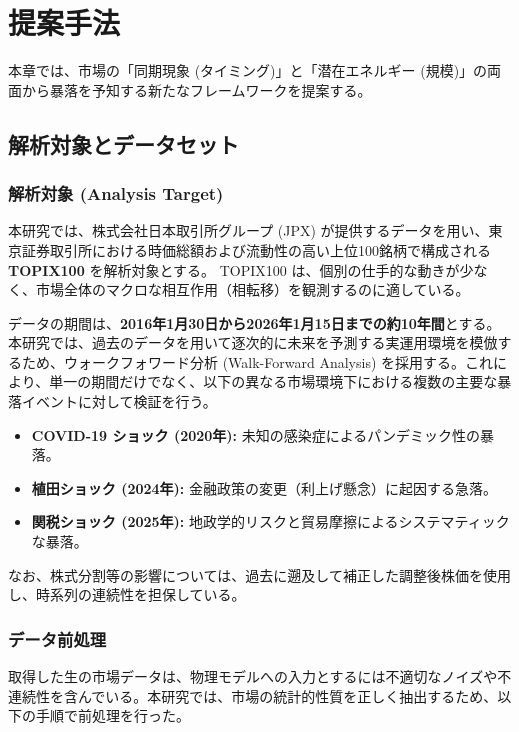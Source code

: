 \documentclass[11pt,a4paper,oneside]{ltjsarticle}
\begin{document}
\clearpage
\section{提案手法}
本章では、市場の「同期現象 (タイミング)」と「潜在エネルギー (規模)」の両面から暴落を予知する新たなフレームワークを提案する。

\subsection{解析対象とデータセット}
\subsubsection{解析対象 (Analysis Target)}
本研究では、株式会社日本取引所グループ (JPX) が提供するデータを用い、東京証券取引所における時価総額および流動性の高い上位100銘柄で構成される \textbf{TOPIX100} を解析対象とする。
TOPIX100 は、個別の仕手的な動きが少なく、市場全体のマクロな相互作用（相転移）を観測するのに適している。

データの期間は、\textbf{2016年1月30日から2026年1月15日までの約10年間}とする。
本研究では、過去のデータを用いて逐次的に未来を予測する実運用環境を模倣するため、ウォークフォワード分析 (Walk-Forward Analysis) を採用する。これにより、単一の期間だけでなく、以下の異なる市場環境下における複数の主要な暴落イベントに対して検証を行う。

\begin{itemize}
    \item \textbf{COVID-19 ショック (2020年):} 未知の感染症によるパンデミック性の暴落。
    \item \textbf{植田ショック (2024年):} 金融政策の変更（利上げ懸念）に起因する急落。
    \item \textbf{関税ショック (2025年):} 地政学的リスクと貿易摩擦によるシステマティックな暴落。
\end{itemize}

なお、株式分割等の影響については、過去に遡及して補正した調整後株価を使用し、時系列の連続性を担保している。

\subsubsection{データ前処理}
取得した生の市場データは、物理モデルへの入力とするには不適切なノイズや不連続性を含んでいる。本研究では、市場の統計的性質を正しく抽出するため、以下の手順で前処理を行った。
\end{document}
